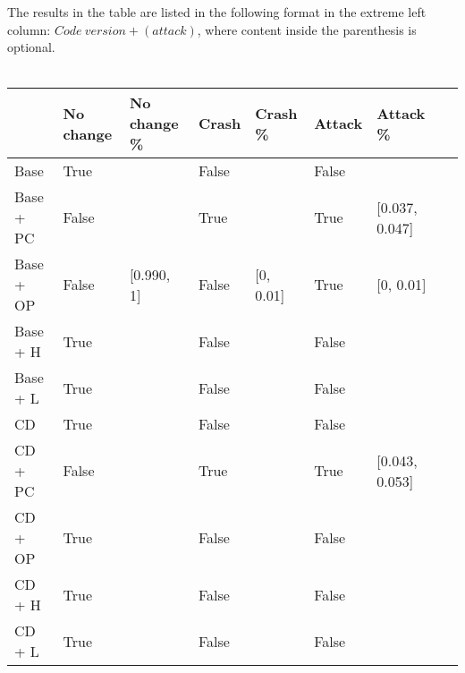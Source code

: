 The results in the table are listed in the following format in the extreme left column: $Code\:version + (attack)$, where content inside the parenthesis is optional.\\\\

\begin{table}
    \begin{tabular}{l|l|l|l|l|l|l|l}
    ~         & No change & No change \% & Crash & Crash \% & Attack & Attack \% \\ \hline
    Base      & True &\relax[0.990, 1] & False & \relax[0, 0.01] & False & \relax[0, 0.01] ~                                                                                    & ~ \\
    Base + PC & False & \relax[0.768, 0.778] & True & \relax[0.180, 0.190] & True & [0.037, 0.047]                                                                                   & ~ \\
    Base + OP & False & [0.990, 1] & False & [0, 0.01] & True & [0, 0.01]                                                                                   & ~ \\
    Base + H  & True &\relax[0.990, 1] & False & \relax[0, 0.01] & False & \relax[0, 0.01]                                                                                    & ~ \\
    Base + L  & True &\relax[0.990, 1] & False & \relax[0, 0.01] & False & \relax[0, 0.01]                                                                                    & ~ \\
    CD        & True &\relax[0.990, 1] & False & \relax[0, 0.01] & False & \relax[0, 0.01]                                                                                    & ~ \\
    CD + PC   & False & \relax[0.765, 0.775] & True & \relax[0.177, 0.187] & True & [0.043, 0.053]                                                                                & ~ \\
    CD + OP   & True &\relax[0.990, 1] & False & \relax[0, 0.01] & False & \relax[0, 0.01]                                                                                   & ~ \\
    CD + H    & True &\relax[0.990, 1] & False & \relax[0, 0.01] & False & \relax[0, 0.01]                                                                                    & ~ \\
    CD + L    & True &\relax[0.990, 1] & False & \relax[0, 0.01] & False & \relax[0, 0.01]                                                                                    & ~ \\

\end{tabular}
\end{table}
